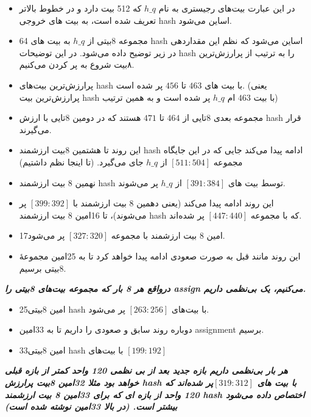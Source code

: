 \begin{itemize}
	\item
	      در این عبارت بیت‌های رجیستری به نام
	      $h\_q$ 
	      که 512 بیت دارد و در خطوط بالاتر تعریف شده است، به بیت های خروجی hash اساین می‌شود.
	\item
	      64 مجموعه 8بیتی از $h\_q$ به بیت های hash اساین می‌شود که نظم این مقداردهی در زیر توضیح داده می‌شود. در این توضیحات hash را به ترتیب از پرارزش‌ترین ۸بیت شروع به پر کردن می‌کنیم.
	\item
	      پرارزش‌ترین بیت‌های hash با بیت های $463$ تا $456$ پر شده است. (یعنی پرارزش‌ترین بیت hash با بیت $463$ ام $h\_q$ پر شده است و به همین ترتیب)
	\item
	      مجموعه بعدی 8تایی از $464$ تا $471$ هستند که در دومین 8تایی با ارزش hash قرار می‌گیرند.
	\item
	      این روند تا هشتمین 8بیت ارزشمند hash ادامه پیدا می‌کند جایی که در این جایگاه مجموعه $[511:504]$ از $h\_q$ جای می‌گیرد. (تا اینجا نظم داشتیم)
	\item
	      نهمین 8 بیت ارزشمند hash توسط بیت های $[391:384]$ از $h\_q$ پر می‌شوند.
	\item
	      این روند ادامه پیدا می‌کند (یعنی دهمین 8 بیت ارزشمند با $[399:392]$ پر می‌شوند)،
	      تا 16امین 8 بیت ارزشمند hash که با مجموعه $[447:440]$ پر شده‌اند.
	\item
	      17امین 8 بیت ارزشمند با مجموعه $[327:320]$ پر می‌شود.
	\item
	      این روند مانند قبل به صورت صعودی ادامه پیدا خواهد کرد تا به 25امین مجموعهٔ 8بیتی برسیم.
	      
\end{itemize}

\textit{\textbf{درواقع هر 8 بار که مجموعه بیت‌های 8بیتی را assign می‌کنیم، یک بی‌نظمی داریم.
}}
\begin{itemize}
	\item
	      25امین 8بیتی hash با بیت‌های $[263:256]$ پر می‌شود.
	\item
	      دوباره روند سابق و صعودی را داریم تا به 33امین assignment برسیم.
	\item
	      33امین 8بیتی hash با بیت‌های $[199:192]$
	      
\end{itemize}

\textit{\textbf{هر بار بی‌نظمی داریم بازه جدید بعد از بی نظمی 120 واحد کمتر از بازه قبلی خواهد بود مثلا 32امین 8بیت پرارزش hash با بیت های $[319:312] $پر شده‌اند که 120 واحد از بازه ای که برای 33امین 8 بیت ارزشمند hash اختصاص داده می‌شود بیشتر است. (در بالا 33امین نوشته شده است)}}

